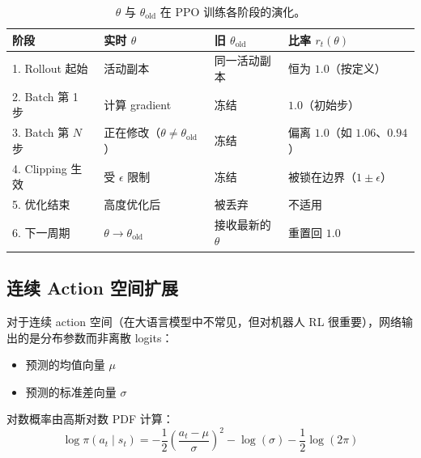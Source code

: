 \begin{table}[ht!]
\centering\small
\caption{$\theta$ 与 $\theta_{\text{old}}$ 在 PPO 训练各阶段的演化。}
\noindent\begin{tabularx}{\linewidth}{@{}l Z{0.98} Z{0.52} Z{1.5}@{}}
\toprule
\textbf{阶段} & \textbf{实时 $\theta$} & \textbf{旧 $\theta_{\text{old}}$} & \textbf{比率 $r_t(\theta)$} \\
. Rollout 起始 & 活动副本 & 同一活动副本 & 恒为 $1.0$（按定义） \\
2. Batch 第 1 步 & 计算 gradient & 冻结 & $1.0$（初始步） \\
3. Batch 第 $N$ 步 & 正在修改（$\theta \neq \theta_{\text{old}}$） & 冻结 & 偏离 $1.0$（如 $1.06$、$0.94$） \\
4. Clipping 生效 & 受 $\epsilon$ 限制 & 冻结 & 被锁在边界（$1 \pm \epsilon$） \\
5. 优化结束 & 高度优化后 & 被丢弃 & 不适用 \\
6. 下一周期 & $\theta \rightarrow \theta_{\text{old}}$ & 接收最新的 $\theta$ & 重置回 $1.0$ \\
\bottomrule
\end{tabularx}
\end{table}

\subsection{连续 Action 空间扩展}
\label{continuous-action-spaces-extension}

对于连续 action 空间（在大语言模型中不常见，但对机器人 RL 很重要），网络输出的是分布参数而非离散 logits：

\begin{itemize}
  \item 预测的均值向量 $\mu$
  \item 预测的标准差向量 $\sigma$
\end{itemize}

对数概率由高斯对数 PDF 计算：
\begin{equation}
\boxed{\log \pi(a_t \mid s_t) = -\frac{1}{2}\left(\frac{a_t - \mu}{\sigma}\right)^{\!2} - \log(\sigma) - \frac{1}{2}\log(2\pi)}
\end{equation}

